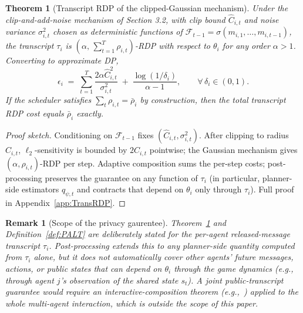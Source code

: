 \documentclass{article}
\newtheorem{theorem}{Theorem}
\newtheorem{remark}{Remark}
\begin{document}
\begin{theorem}[Transcript RDP of the clipped-Gaussian mechanism]
    \label{thm:TransRDP}
    Under the clip-and-add-noise mechanism of Section 3.2, with clip bound $\hat{C}_{i,t}$ and noise variance $\sigma_{i,t}^2$ chosen as deterministic functions of $\mathcal{F}_{t-1} = \sigma(m_{i,1}, \ldots, m_{i,t-1})$, the transcript $\tau_i$ is $(\alpha,\, \sum_{t=1}^T \rho_{i,t})$-RDP with respect to $\theta_i$ for any order $\alpha > 1$. Converting to approximate DP,
    \begin{equation}
        \epsilon_i \;=\; \sum_{t=1}^T \frac{2\alpha \hat{C}_{i,t}^2}{\sigma_{i,t}^2} \;+\; \frac{\log(1/\delta_i)}{\alpha - 1}, \qquad \forall\, \delta_i \in (0,1).
    \end{equation}
    If the scheduler satisfies $\sum_t \rho_{i,t} = \bar\rho_i$ by construction, then the total transcript RDP cost equals $\bar\rho_i$ exactly.
\end{theorem}

\begin{proof}[Proof sketch]
    Conditioning on $\mathcal{F}_{t-1}$ fixes $(\hat{C}_{i,t}, \sigma_{i,t}^2)$. After clipping to radius $\hat C_{i,t}$, $\ell_2$-sensitivity is bounded by $2\hat{C}_{i,t}$ pointwise; the Gaussian mechanism gives $(\alpha, \rho_{i,t})$-RDP per step. Adaptive composition sums the per-step costs; post-processing preserves the guarantee on any function of $\tau_i$ (in particular, planner-side estimators $q_{\psi,t}$ and contracts that depend on $\theta_i$ only through $\tau_i$). Full proof in Appendix~\ref{app:TransRDP}.
\end{proof}

\begin{remark}[Scope of the privacy gaurentee]
    Theorem~\ref{thm:TransRDP} and Definition~\ref{def:PALT} are deliberately stated for the per-agent released-message transcript $\tau_i$. Post-processing extends this to any planner-side quantity computed from $\tau_i$ alone, but it does not  automatically cover other agents' future messages, actions, or public states that can depend on $\theta_i$ through the game dynamics (e.g., through agent $j$'s observation of the shared state $s_t$). A joint public-transcript guarantee would require an interactive-composition theorem (e.g.,~\cite{lyu2022composition}) applied to the whole multi-agent interaction, which is outside the scope of this paper.
\end{remark}
\end{document}
